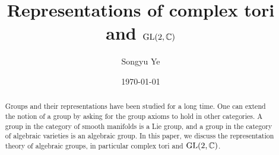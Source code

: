 \documentclass{amsart}
\numberwithin{equation}{section}
\theoremstyle{plain} %
\theoremstyle{definition}
\theoremstyle{remark}
\begin{document}
\title{Representations of complex tori and $\operatorname{GL}(2,\mathbb{C})$}


\author{Songyu Ye} 

\address{}






\date{\today}

\begin{abstract}
  Groups and their representations have been studied for a long time. One can extend the 
  notion of a group by asking for the group axioms to hold in other categories. A group in 
  the category of smooth manifolds is a Lie group, and a group in the category of algebraic varieties
  is an algebraic group. In this paper, we discuss the representation theory of algebraic groups, 
  in particular complex tori and $\operatorname{GL}(2,\mathbb{C})$.
\end{abstract}


\maketitle



\end{document}
